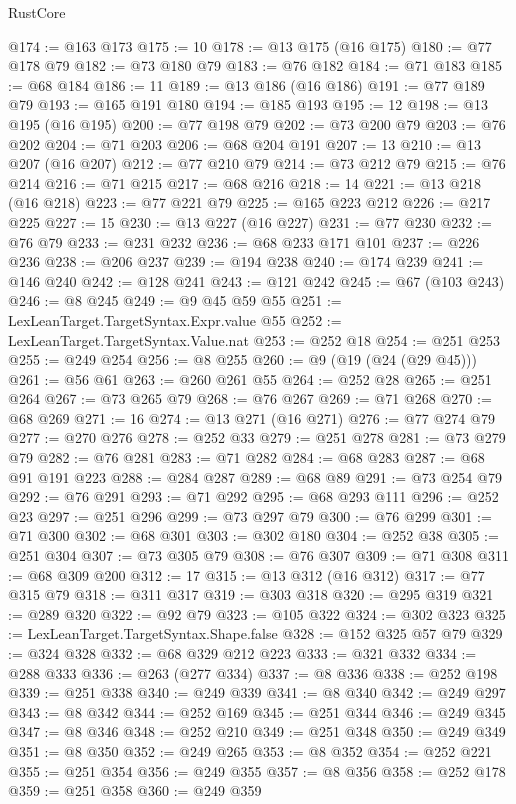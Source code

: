 \begin{lexlean}{RustCore}
\begin{coremodule}
@174 := @163 @173
@175 := 10
@178 := @13 @175 (@16 @175)
@180 := @77 @178 @79
@182 := @73 @180 @79
@183 := @76 @182
@184 := @71 @183
@185 := @68 @184
@186 := 11
@189 := @13 @186 (@16 @186)
@191 := @77 @189 @79
@193 := @165 @191 @180
@194 := @185 @193
@195 := 12
@198 := @13 @195 (@16 @195)
@200 := @77 @198 @79
@202 := @73 @200 @79
@203 := @76 @202
@204 := @71 @203
@206 := @68 @204 @191
@207 := 13
@210 := @13 @207 (@16 @207)
@212 := @77 @210 @79
@214 := @73 @212 @79
@215 := @76 @214
@216 := @71 @215
@217 := @68 @216
@218 := 14
@221 := @13 @218 (@16 @218)
@223 := @77 @221 @79
@225 := @165 @223 @212
@226 := @217 @225
@227 := 15
@230 := @13 @227 (@16 @227)
@231 := @77 @230
@232 := @76 @79
@233 := @231 @232
@236 := @68 @233 @171 @101
@237 := @226 @236
@238 := @206 @237
@239 := @194 @238
@240 := @174 @239
@241 := @146 @240
@242 := @128 @241
@243 := @121 @242
@245 := @67 (@103 @243)
@246 := @8 @245
@249 := @9 @45 @59 @55
@251 := LexLeanTarget.TargetSyntax.Expr.value @55
@252 := LexLeanTarget.TargetSyntax.Value.nat
@253 := @252 @18
@254 := @251 @253
@255 := @249 @254
@256 := @8 @255
@260 := @9 (@19 (@24 (@29 @45)))
@261 := @56 @61
@263 := @260 @261 @55
@264 := @252 @28
@265 := @251 @264
@267 := @73 @265 @79
@268 := @76 @267
@269 := @71 @268
@270 := @68 @269
@271 := 16
@274 := @13 @271 (@16 @271)
@276 := @77 @274 @79
@277 := @270 @276
@278 := @252 @33
@279 := @251 @278
@281 := @73 @279 @79
@282 := @76 @281
@283 := @71 @282
@284 := @68 @283
@287 := @68 @91 @191 @223
@288 := @284 @287
@289 := @68 @89
@291 := @73 @254 @79
@292 := @76 @291
@293 := @71 @292
@295 := @68 @293 @111
@296 := @252 @23
@297 := @251 @296
@299 := @73 @297 @79
@300 := @76 @299
@301 := @71 @300
@302 := @68 @301
@303 := @302 @180
@304 := @252 @38
@305 := @251 @304
@307 := @73 @305 @79
@308 := @76 @307
@309 := @71 @308
@311 := @68 @309 @200
@312 := 17
@315 := @13 @312 (@16 @312)
@317 := @77 @315 @79
@318 := @311 @317
@319 := @303 @318
@320 := @295 @319
@321 := @289 @320
@322 := @92 @79
@323 := @105 @322
@324 := @302 @323
@325 := LexLeanTarget.TargetSyntax.Shape.false
@328 := @152 @325 @57 @79
@329 := @324 @328
@332 := @68 @329 @212 @223
@333 := @321 @332
@334 := @288 @333
@336 := @263 (@277 @334)
@337 := @8 @336
@338 := @252 @198
@339 := @251 @338
@340 := @249 @339
@341 := @8 @340
@342 := @249 @297
@343 := @8 @342
@344 := @252 @169
@345 := @251 @344
@346 := @249 @345
@347 := @8 @346
@348 := @252 @210
@349 := @251 @348
@350 := @249 @349
@351 := @8 @350
@352 := @249 @265
@353 := @8 @352
@354 := @252 @221
@355 := @251 @354
@356 := @249 @355
@357 := @8 @356
@358 := @252 @178
@359 := @251 @358
@360 := @249 @359

\end{coremodule}
\end{lexlean}
